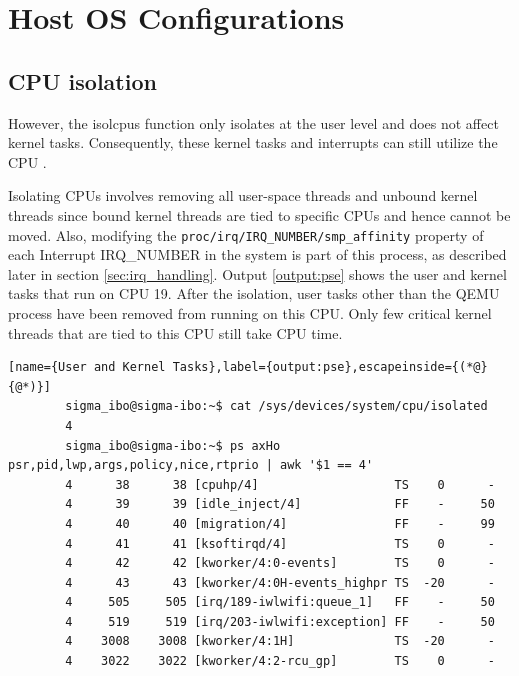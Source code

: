 \documentclass[MMR,Master,english]{twbook}
\begin{document}
\section{Host OS Configurations}
\subsection{CPU isolation}

However, the isolcpus function only isolates at the user level and does not affect kernel tasks. Consequently, these kernel tasks and interrupts can still utilize the CPU \cite{maPerformanceTuningKVMbased}. 

Isolating CPUs involves removing all user-space threads and unbound kernel threads since bound kernel threads are tied to specific CPUs and hence cannot be moved. Also, modifying the \texttt{proc/irq/IRQ\_NUMBER/smp\_affinity} property of each Interrupt IRQ\_NUMBER in the system is part of this process, as described later in section \ref{sec:irq_handling}. Output \ref{output:pse} shows the user and kernel tasks that run on CPU 19. After the isolation, user tasks other than the QEMU process have been removed from running on this CPU. Only few critical kernel threads that are tied to this CPU still take CPU time.

\vspace{1em}
\begin{minipage}{0.95\columnwidth}
	\begin{lstlisting}[name={User and Kernel Tasks},label={output:pse},escapeinside={(*@}{@*)}]
		sigma_ibo@sigma-ibo:~$ cat /sys/devices/system/cpu/isolated
		4
		sigma_ibo@sigma-ibo:~$ ps axHo psr,pid,lwp,args,policy,nice,rtprio | awk '$1 == 4'
		4      38      38 [cpuhp/4]                   TS    0      -
		4      39      39 [idle_inject/4]             FF    -     50
		4      40      40 [migration/4]               FF    -     99
		4      41      41 [ksoftirqd/4]               TS    0      -
		4      42      42 [kworker/4:0-events]        TS    0      -
		4      43      43 [kworker/4:0H-events_highpr TS  -20      -
		4     505     505 [irq/189-iwlwifi:queue_1]   FF    -     50
		4     519     519 [irq/203-iwlwifi:exception] FF    -     50
		4    3008    3008 [kworker/4:1H]              TS  -20      -
		4    3022    3022 [kworker/4:2-rcu_gp]        TS    0      -	  
\end{lstlisting}
\end{minipage}
\end{document}
